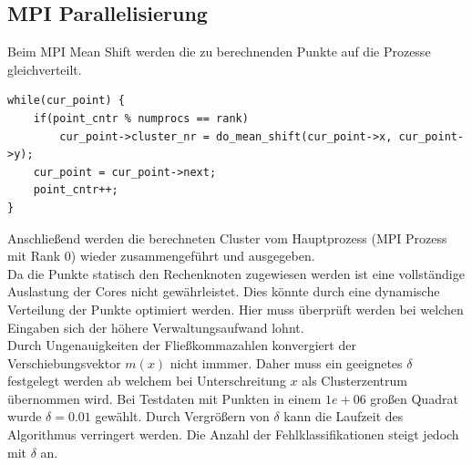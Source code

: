 	\subsection{MPI Parallelisierung}
	Beim MPI Mean Shift werden die zu berechnenden Punkte auf die Prozesse gleichverteilt.
	\begin{lstlisting}
while(cur_point) {
    if(point_cntr % numprocs == rank)
        cur_point->cluster_nr = do_mean_shift(cur_point->x, cur_point->y);
    cur_point = cur_point->next;
    point_cntr++;
}
	\end{lstlisting}
	Anschließend werden die berechneten Cluster vom Hauptprozess (MPI Prozess mit Rank 0) wieder zusammengeführt und ausgegeben.\\
	Da die Punkte statisch den Rechenknoten zugewiesen werden ist eine vollständige Auslastung der Cores nicht gewährleistet. 
	Dies könnte durch eine dynamische Verteilung der Punkte optimiert werden. Hier muss überprüft werden bei welchen Eingaben
	sich der höhere Verwaltungsaufwand lohnt.\\
	Durch Ungenauigkeiten der Fließkommazahlen konvergiert der Verschiebungsvektor $ m(x) $ nicht immmer. Daher muss ein geeignetes $ \delta $
	festgelegt werden ab welchem bei Unterschreitung $ x $ als Clusterzentrum übernommen wird. Bei Testdaten mit Punkten in einem 
	$ 1e + 06 $ großen Quadrat wurde $ \delta = 0.01 $ gewählt. Durch Vergrößern von $ \delta $ kann die Laufzeit des Algorithmus verringert werden.
	Die Anzahl der Fehlklassifikationen steigt jedoch mit $ \delta $ an.\\
	\vspace{-10pt}
